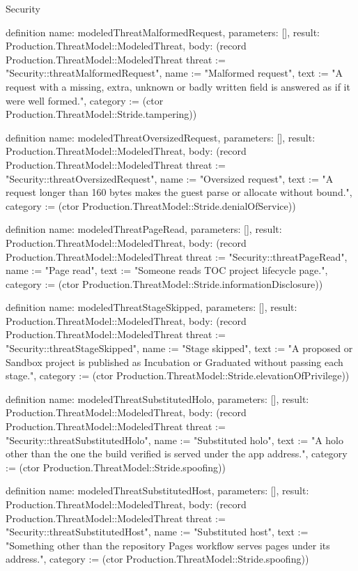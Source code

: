 \begin{lexlean}{Security}
\begin{semanticmodule}
definition{
  name: modeledThreatMalformedRequest,
  parameters: [],
  result: Production.ThreatModel::ModeledThreat,
  body: (record Production.ThreatModel::ModeledThreat {threat := "Security::threatMalformedRequest", name := "Malformed request", text := "A request with a missing, extra, unknown or badly written field is answered as if it were well formed.", category := (ctor Production.ThreatModel::Stride.tampering)})
}

definition{
  name: modeledThreatOversizedRequest,
  parameters: [],
  result: Production.ThreatModel::ModeledThreat,
  body: (record Production.ThreatModel::ModeledThreat {threat := "Security::threatOversizedRequest", name := "Oversized request", text := "A request longer than 160 bytes makes the guest parse or allocate without bound.", category := (ctor Production.ThreatModel::Stride.denialOfService)})
}

definition{
  name: modeledThreatPageRead,
  parameters: [],
  result: Production.ThreatModel::ModeledThreat,
  body: (record Production.ThreatModel::ModeledThreat {threat := "Security::threatPageRead", name := "Page read", text := "Someone reads TOC project lifecycle page.", category := (ctor Production.ThreatModel::Stride.informationDisclosure)})
}

definition{
  name: modeledThreatStageSkipped,
  parameters: [],
  result: Production.ThreatModel::ModeledThreat,
  body: (record Production.ThreatModel::ModeledThreat {threat := "Security::threatStageSkipped", name := "Stage skipped", text := "A proposed or Sandbox project is published as Incubation or Graduated without passing each stage.", category := (ctor Production.ThreatModel::Stride.elevationOfPrivilege)})
}

definition{
  name: modeledThreatSubstitutedHolo,
  parameters: [],
  result: Production.ThreatModel::ModeledThreat,
  body: (record Production.ThreatModel::ModeledThreat {threat := "Security::threatSubstitutedHolo", name := "Substituted holo", text := "A holo other than the one the build verified is served under the app address.", category := (ctor Production.ThreatModel::Stride.spoofing)})
}

definition{
  name: modeledThreatSubstitutedHost,
  parameters: [],
  result: Production.ThreatModel::ModeledThreat,
  body: (record Production.ThreatModel::ModeledThreat {threat := "Security::threatSubstitutedHost", name := "Substituted host", text := "Something other than the repository Pages workflow serves pages under its address.", category := (ctor Production.ThreatModel::Stride.spoofing)})
}


\end{semanticmodule}
\end{lexlean}
